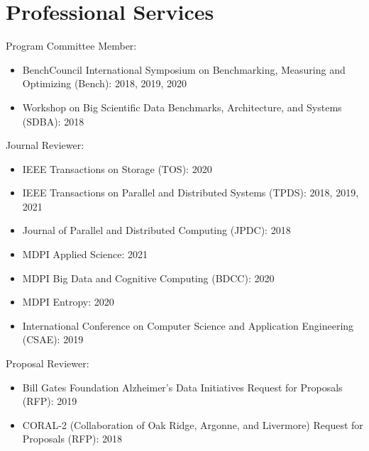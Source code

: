 \section{Professional Services}
Program Committee Member:
\begin{itemize}
\item {BenchCouncil International Symposium on Benchmarking, Measuring and Optimizing (Bench): 2018, 2019, 2020}
\item {Workshop on Big Scientific Data Benchmarks, Architecture, and Systems (SDBA): 2018}
\end{itemize}
Journal Reviewer:
\begin{itemize}
\item {IEEE Transactions on Storage (TOS): 2020}
\item {IEEE Transactions on Parallel and Distributed Systems (TPDS): 2018, 2019, 2021}
\item {Journal of Parallel and Distributed Computing (JPDC): 2018}
\item {MDPI Applied Science: 2021}
\item {MDPI Big Data and Cognitive Computing (BDCC): 2020}
\item {MDPI Entropy: 2020}
\item {International Conference on Computer Science and Application Engineering (CSAE): 2019}
\end{itemize}
Proposal Reviewer:
\begin{itemize}
\item {Bill Gates Foundation Alzheimer’s Data Initiatives Request for Proposals (RFP): 2019}
\item {CORAL-2 (Collaboration of Oak Ridge, Argonne, and Livermore) Request for Proposals (RFP): 2018}
\end{itemize}

